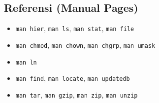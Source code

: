 \subsection*{Referensi (Manual Pages)}
\begin{itemize}
    \item \texttt{man hier}, \texttt{man ls}, \texttt{man stat}, \texttt{man file}
    \item \texttt{man chmod}, \texttt{man chown}, \texttt{man chgrp}, \texttt{man umask}
    \item \texttt{man ln}
    \item \texttt{man find}, \texttt{man locate}, \texttt{man updatedb}
    \item \texttt{man tar}, \texttt{man gzip}, \texttt{man zip}, \texttt{man unzip}
\end{itemize}